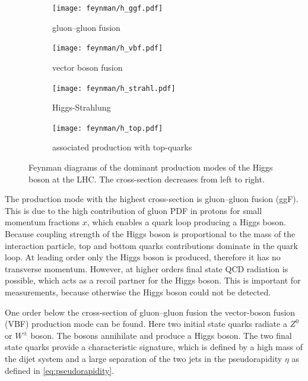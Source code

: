 \begin{figure}[htb]
    \centering
    \begin{subfigure}[t]{0.302\textwidth}
        \texttt{[image: feynman/h\_ggf.pdf]}
        \caption{gluon--gluon fusion}\label{fig:theory:higgs:ggf}
    \end{subfigure}
    \begin{subfigure}[t]{0.201\textwidth}
        \captionsetup{justification=raggedright}
        \texttt{[image: feynman/h\_vbf.pdf]}
        \caption{vector boson fusion}\label{fig:theory:higgs:vbf}
    \end{subfigure}
    \begin{subfigure}[t]{0.201\textwidth}
        \texttt{[image: feynman/h\_strahl.pdf]}
        \caption{Higgs-Strahlung}\label{fig:theory:higgs:vh}
    \end{subfigure}
    \begin{subfigure}[t]{0.246\textwidth}
        \captionsetup{justification=raggedright}
        \texttt{[image: feynman/h\_top.pdf]}
        \caption{associated \mbox{production} with top-quarks}\label{fig:theory:higgs:tassoc}
    \end{subfigure}
    \caption{Feynman diagrams of the dominant production modes of the Higgs boson at the LHC\@. The cross-section
             decreases from left to right.}\label{fig:theory:higgs:production}
\end{figure}

The production mode with the highest cross-section is gluon--gluon fusion (ggF).
This is due to the high contribution of gluon PDF in protons for small momentum fractions $x$, which enables
a quark loop producing a Higgs boson. Because coupling strength of the Higgs boson is proportional to the mass of the
interaction particle, top and bottom quarks contributions dominate in the quark loop.
At leading order only the Higgs boson is produced, therefore it has no transverse momentum.
However, at higher orders final state QCD radiation is possible, which acts as a recoil partner for the Higgs boson.
This is important for measurements, because otherwise the Higgs boson could not be detected.

One order below the cross-section of gluon--gluon fusion the vector-boson fusion (VBF) production mode can be found.
Here two initial state quarks radiate a $Z^0$ or $W^\pm$ boson.
The bosons annihilate and produce a Higgs boson.
The two final state quarks provide a characteristic signature, which is defined by a high mass of the dijet system
and a large separation of the two jets in the pseudorapidity $\eta$ as defined in \cref{eq:pseudorapidity}.


